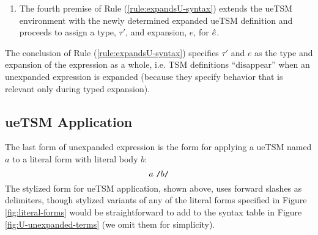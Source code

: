 \begin{enumerate}
ueTSM environments are finite mappings from TSM names, $a$, to \emph{expanded ueTSM definitions}, $\xuetsmdef{\tau}{\eparse}$, where $\tau$ is the ueTSM's {type annotation} and $\eparse$ is the ueTSM's {expanded parse function}. The \emph{ueTSM environment formation judgement}, $\uetsmenv{\Delta}{\Sigma}$, ensures that the type annotations in $\Sigma$ are well-formed assuming $\Delta$ and the parse functions in $\Sigma$ are  of type $\aparr{\tBody}{\tParseResultExp}$.
\[\begin{array}{ll}
\textbf{Judgement Form} & \textbf{Description}\\
\uetsmenv{\Delta}{\Sigma} & \text{ueTSM environment $\Sigma$ is well-formed assuming $\Delta$}\end{array}\]
This judgement is inductively defined by the following rules:
\begin{subequations}\label{rules:uetsmenv-U}
\begin{equation}\label{rule:uetsmenv-empty}
\inferrule{ }{\uetsmenv{\Delta}{\emptyset}}
\end{equation}
\begin{equation}\label{rule:uetsmenv-ext}
\inferrule{
  \uetsmenv{\Delta}{\Sigma}\\
  \istypeU{\Delta}{\tau}\\
  \hastypeU{\emptyset}{\emptyset}{\eparse}{\aparr{\tBody}{\tParseResultExp}}
}{
  \uetsmenv{\Delta}{\Sigma, \xuetsmbnd{a}{\tau}{\eparse}}
}
\end{equation}
\end{subequations}

\item 
The fourth premise of Rule (\ref{rule:expandsU-syntax}) extends the ueTSM environment with the newly determined expanded ueTSM definition and proceeds to assign a type, $\tau'$, and expansion, $e$, for $\hat{e}$.
\end{enumerate}
The conclusion of Rule (\ref{rule:expandsU-syntax}) specifies $\tau'$ and $e$ as the type and expansion of the expression as a whole, i.e. TSM definitions ``disappear'' when an unexpanded expression is expanded (because they specify behavior that is relevant only during typed expansion). 

\subsection{ueTSM Application}\label{sec:U-uetsm-application}
The last form of unexpanded expression is the form for applying a ueTSM named $a$ to a literal form with literal body $b$:
\[
a~\texttt{/}b\texttt{/}
\] 
The stylized form for ueTSM application, shown above, uses forward slashes as delimiters, though stylized variants of any of the literal forms specified in Figure \ref{fig:literal-forms} would be straightforward to add to the syntax table in Figure \ref{fig:U-unexpanded-terms} (we omit them for simplicity).

